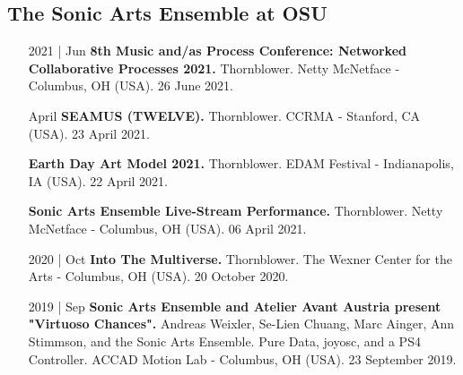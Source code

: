 \documentclass[12pt,overlapped]{res}%
\begin{document}
\begin{resume}
\subsection{The Sonic Arts Ensemble at OSU}%
\fullline%
\begin{itemize}[align=parleft,leftmargin=2.25cm,labelwidth=2cm]
\item[2021 | Jun]
\textbf{8th Music and/as Process Conference: Networked Collaborative Processes 2021.}
Thornblower. 
Netty McNetface {-} Columbus, OH (USA). 
26 June 2021.
\end{itemize}%
\begin{itemize}[align=parleft,leftmargin=2.25cm,labelwidth=2cm]
\item[April]
\textbf{SEAMUS (TWELVE).}
Thornblower. 
CCRMA {-} Stanford, CA (USA). 
23 April 2021.
\end{itemize}%
\begin{itemize}[align=parleft,leftmargin=2.25cm,labelwidth=2cm]
\item[]
\textbf{Earth Day Art Model 2021.}
Thornblower. 
EDAM Festival {-} Indianapolis, IA (USA). 
22 April 2021.
\end{itemize}%
\begin{itemize}[align=parleft,leftmargin=2.25cm,labelwidth=2cm]
\item[]
\textbf{Sonic Arts Ensemble Live{-}Stream Performance.}
Thornblower. 
Netty McNetface {-} Columbus, OH (USA). 
06 April 2021.
\end{itemize}%
\begin{itemize}[align=parleft,leftmargin=2.25cm,labelwidth=2cm]
\item[2020 | Oct]
\textbf{Into The Multiverse.}
Thornblower. 
The Wexner Center for the Arts {-} Columbus, OH (USA). 
20 October 2020.
\end{itemize}%
\begin{itemize}[align=parleft,leftmargin=2.25cm,labelwidth=2cm]
\item[2019 | Sep]
\textbf{Sonic Arts Ensemble and Atelier Avant Austria present "Virtuoso Chances".}
Andreas Weixler, Se{-}Lien Chuang, Marc Ainger, Ann Stimmson, and the Sonic Arts Ensemble. 
Pure Data, joyosc, and a PS4 Controller. 
ACCAD Motion Lab {-} Columbus, OH (USA). 
23 September 2019.
\end{itemize}%

\end{resume}
\end{document}
